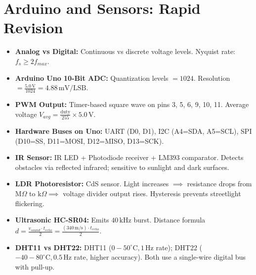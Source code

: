 \chapter{Arduino and Sensors: Rapid Revision}

\begin{highyieldbox}
\begin{itemize}[leftmargin=*]
    \item \textbf{Analog vs Digital:} Continuous vs discrete voltage levels. Nyquist rate: $f_s \ge 2 f_{max}$.
    \item \textbf{Arduino Uno 10-Bit ADC:} Quantization levels $= 1024$. Resolution $= \frac{5.0\,\text{V}}{1024} = 4.88\,\text{mV/LSB}$.
    \item \textbf{PWM Output:} Timer-based square wave on pins 3, 5, 6, 9, 10, 11. Average voltage $V_{avg} = \frac{\text{duty}}{255} \times 5.0\,\text{V}$.
    \item \textbf{Hardware Buses on Uno:} UART (D0, D1), I2C (A4=SDA, A5=SCL), SPI (D10=SS, D11=MOSI, D12=MISO, D13=SCK).
    \item \textbf{IR Sensor:} IR LED + Photodiode receiver + LM393 comparator. Detects obstacles via reflected infrared; sensitive to sunlight and dark surfaces.
    \item \textbf{LDR Photoresistor:} CdS sensor. Light increases $\implies$ resistance drops from $\text{M}\Omega$ to $\text{k}\Omega \implies$ voltage divider output rises. Hysteresis prevents streetlight flickering.
    \item \textbf{Ultrasonic HC-SR04:} Emits $40\,\text{kHz}$ burst. Distance formula $d = \frac{v_{sound} \cdot t_{echo}}{2} = \frac{(340\,\text{m/s}) \cdot t_{echo}}{2}$.
    \item \textbf{DHT11 vs DHT22:} DHT11 ($0-50^\circ\text{C}, 1\,\text{Hz}$ rate); DHT22 ($-40-80^\circ\text{C}, 0.5\,\text{Hz}$ rate, higher accuracy). Both use a single-wire digital bus with pull-up.
\end{itemize}
\end{highyieldbox}
